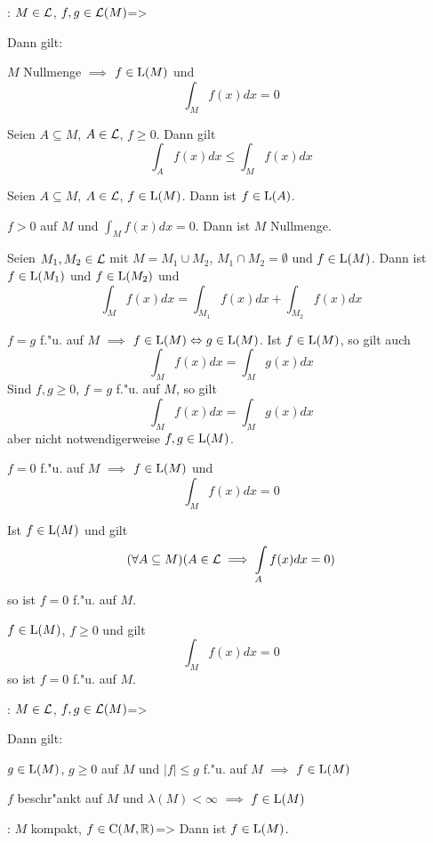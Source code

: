 \theorem: $M\in\mathcal{L}$, $f,g\in\mathcal{L}(M)$=>{
  Dann gilt:
  \begin{stmts}
    \item $M$ Nullmenge $\implies$ $f\in{\rm L}(M)$ und
      \[\int_M f(x)dx=0
        \]
    \item Seien $A\subseteq M$, $A\in\mathcal{L}$, $f\ge 0$. Dann gilt
      \[\int_A f(x)dx\le \int_M f(x)dx
        \]
    \item Seien $A\subseteq M$, $A\in\mathcal{L}$, $f\in{\rm L}(M)$. Dann ist
      $f\in{\rm L}(A)$.
    \item $f>0$ auf $M$ und $\int_M f(x)dx=0$. Dann ist $M$ Nullmenge.
    \item Seien $M_1,M_2\in\mathcal{L}$ mit $M=M_1\cup M_2$, 
      $M_1\cap M_2=\emptyset$ und $f\in{\rm L}(M)$. Dann ist
      $f\in{\rm L}(M_1)$ und $f\in{\rm L}(M_2)$ und
      \[\int_M f(x) dx=\int_{M_1} f(x) dx+\int_{M_2} f(x) dx
        \]
    \item $f=g$ f."u. auf $M$ $\implies$
      $f\in{\rm L}(M)\Leftrightarrow g\in{\rm L}(M)$. Ist $f\in{\rm L}(M)$, 
      so gilt auch
      \[\int_M f(x)dx=\int_M g(x) dx
        \]
      Sind $f,g\ge 0$, $f=g$ f."u. auf $M$, so gilt 
      \[\int_M f(x)dx=\int_M g(x) dx
        \]
      aber nicht notwendigerweise $f,g\in{\rm L}(M)$.
    \item $f=0$ f."u. auf $M$ $\implies$ $f\in{\rm L}(M)$ und
      \[\int_M f(x)dx=0
        \]
    \item Ist $f\in{\rm L}(M)$ und gilt
      \[(\forall A\subseteq M)(A\in\SetLMeas\implies\int_A f(x)dx=0)
        \]
      so ist $f=0$ f."u. auf $M$.
    \item $f\in{\rm L}(M)$, $f\ge 0$ und gilt
      \[\int_M f(x)dx=0
        \]
      so ist $f=0$ f."u. auf $M$.
    \end{stmts}
  }
\theorem: $M\in\mathcal{L}$, $f,g\in\mathcal{L}(M)$=>{
  Dann gilt:
  \begin{stmts}
    \item $g\in{\rm L}(M)$, $g\ge 0$ auf $M$ und $|f|\le g$ f."u. auf $M$ 
      $\implies$ $f\in{\rm L}(M)$
    \item $f$ beschr"ankt auf $M$ und $\lambda(M)<\infty$ $\implies$ 
      $f\in{\rm L}(M)$
    \end{stmts}
  }
\theorem: $M$ kompakt, $f\in{\rm C}(M,\mathbb R)$=>{ 
  Dann ist $f\in{\rm L}(M)$. 
  }
